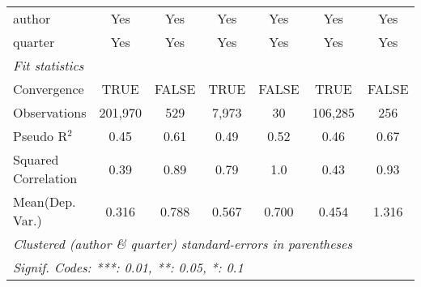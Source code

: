 \begin{tabular}{lcccccc}
   author                                                     & Yes           & Yes           & Yes            & Yes            & Yes            & Yes\\  
   quarter                                                    & Yes           & Yes           & Yes            & Yes            & Yes            & Yes\\  
   \midrule
   \emph{Fit statistics}\\
   Convergence                                                &TRUE           & FALSE         & TRUE           & FALSE          & TRUE           & FALSE\\  
   Observations                                               & 201,970       & 529           & 7,973          & 30             & 106,285        & 256\\  
   Pseudo R$^2$                                               & 0.45          & 0.61          & 0.49           & 0.52           & 0.46           & 0.67\\  
   Squared Correlation                                        & 0.39          & 0.89          & 0.79           & 1.0            & 0.43           & 0.93\\  
Mean(Dep. Var.) & 0.316 & 0.788 & 0.567 & 0.700 & 0.454 & 1.316 \\
   \midrule \midrule
   \multicolumn{7}{l}{\emph{Clustered (author \& quarter) standard-errors in parentheses}}\\
   \multicolumn{7}{l}{\emph{Signif. Codes: ***: 0.01, **: 0.05, *: 0.1}}\\
\end{tabular}
\par\endgroup

